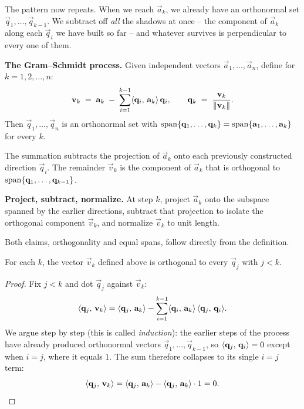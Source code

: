 The pattern now repeats. When we reach $\vec{a}_k$, we already have an orthonormal set
$\vec{q}_1,\dots,\vec{q}_{k-1}$. We subtract off \emph{all} the shadows at once -- the
component of $\vec{a}_k$ along each $\vec{q}_i$ we have built so far -- and whatever
survives is perpendicular to every one of them.

\begin{formalbox}
\textbf{The Gram--Schmidt process.} Given independent vectors
$\vec{a}_1,\dots,\vec{a}_n$, define for $k=1,2,\dots,n$:
\[
  \mathbf{v}_k \;=\; \mathbf{a}_k \;-\; \sum_{i=1}^{k-1} \langle \mathbf{q}_i,\, \mathbf{a}_k \rangle\,\mathbf{q}_i,
  \qquad
  \mathbf{q}_k \;=\; \frac{\mathbf{v}_k}{\lVert\mathbf{v}_k\rVert}.
\]
Then $\vec{q}_1,\dots,\vec{q}_n$ is an orthonormal set with
$\operatorname{span}\{\mathbf{q}_1,\dots,\mathbf{q}_k\}=\operatorname{span}\{\mathbf{a}_1,\dots,\mathbf{a}_k\}$ for every $k$.
\end{formalbox}

The summation subtracts the projection of $\vec{a}_k$ onto each previously constructed
direction $\vec{q}_i$. The remainder $\vec{v}_k$ is the component of $\vec{a}_k$ that is
orthogonal to $\operatorname{span}\{\mathbf{q}_1,\dots,\mathbf{q}_{k-1}\}$.

\begin{focusbox}
\textbf{Project, subtract, normalize.} At step $k$, project $\vec{a}_k$ onto the
subspace spanned by the earlier directions, subtract that projection to isolate the
orthogonal component $\vec{v}_k$, and normalize $\vec{v}_k$ to unit length.
\end{focusbox}

Both claims, orthogonality and equal spans, follow directly from the definition.

\begin{proposition}[Orthogonality]
\label{ch20:orth-prop}
For each $k$, the vector $\vec{v}_k$ defined above is orthogonal to every
$\vec{q}_j$ with $j<k$.
\end{proposition}

\begin{proof}
Fix $j<k$ and dot $\vec{q}_j$ against $\vec{v}_k$:
\[
  \langle \mathbf{q}_j,\, \mathbf{v}_k \rangle
   = \langle \mathbf{q}_j,\, \mathbf{a}_k \rangle
     - \sum_{i=1}^{k-1}\langle \mathbf{q}_i,\, \mathbf{a}_k \rangle\,\langle \mathbf{q}_j,\, \mathbf{q}_i \rangle.
\]
We argue step by step (this is called \emph{induction}): the earlier steps of the
process have already produced orthonormal vectors $\vec{q}_1,\dots,\vec{q}_{k-1}$, so
$\langle \mathbf{q}_j,\, \mathbf{q}_i \rangle=0$ except when $i=j$, where it equals
$1$. The sum therefore collapses to its single $i=j$ term:
\[
  \langle \mathbf{q}_j,\, \mathbf{v}_k \rangle
   = \langle \mathbf{q}_j,\, \mathbf{a}_k \rangle - \langle \mathbf{q}_j,\, \mathbf{a}_k \rangle\cdot 1 = 0. \qedhere
\]
\end{proof}

